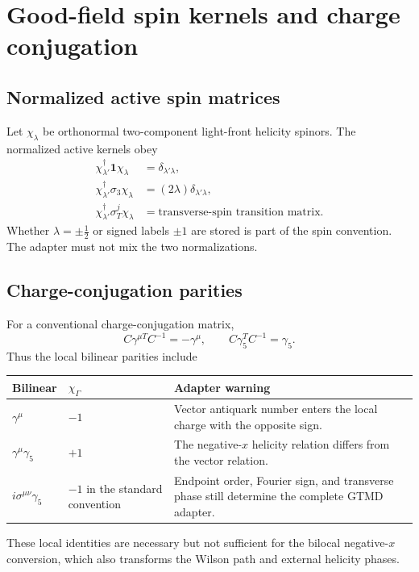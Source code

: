 \documentclass[11pt]{article}
\newcommand{\bbone}{\bm 1}
\begin{document}
\section{Good-field spin kernels and charge conjugation}
\label{app:good-field}

\subsection{Normalized active spin matrices}

Let \(\chi_\lambda\) be orthonormal two-component light-front helicity
spinors.  The normalized active kernels obey
\begin{align}
 \chi_{\lambda'}^\dagger\bbone\chi_\lambda
 &=\delta_{\lambda'\lambda},
\label{eq:good-unpol}\\
 \chi_{\lambda'}^\dagger\sigma_3\chi_\lambda
 &=(2\lambda)\delta_{\lambda'\lambda},
\label{eq:good-helicity}\\
 \chi_{\lambda'}^\dagger\sigma_T^j\chi_\lambda
 &=\text{transverse-spin transition matrix}.
\label{eq:good-transverse}
\end{align}
Whether \(\lambda=\pm\tfrac12\) or signed labels \(\pm1\) are stored is part
of the spin convention.  The adapter must not mix the two normalizations.

\subsection{Charge-conjugation parities}

For a conventional charge-conjugation matrix,
\begin{equation}
 C\gamma^{\mu T}C^{-1}=-\gamma^\mu,
 \qquad
 C\gamma_5^T C^{-1}=\gamma_5.
\label{eq:c-matrix-identities}
\end{equation}
Thus the local bilinear parities include
\begin{longtable}{L{0.27\textwidth}L{0.18\textwidth}L{0.45\textwidth}}
\toprule
Bilinear & \(\chi_\Gamma\) & Adapter warning\\
\midrule
\endhead
\(\gamma^\mu\) & \(-1\) & Vector antiquark number enters the local charge with the opposite sign.\\
\(\gamma^\mu\gamma_5\) & \(+1\) & The negative-\(x\) helicity relation differs from the vector relation.\\
\(i\sigma^{\mu\nu}\gamma_5\) & \(-1\) in the standard convention & Endpoint order, Fourier sign, and transverse phase still determine the complete GTMD adapter.\\
\bottomrule
\end{longtable}
These local identities are necessary but not sufficient for the bilocal
negative-\(x\) conversion, which also transforms the Wilson path and external
helicity phases.
\end{document}
